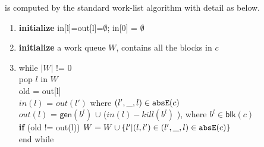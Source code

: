 \begin{enumerate}
is computed by the standard work-list algorithm with detail as below. 
\begin{enumerate}
    \item \textbf{initialize} in[l]=out[l]=$\emptyset$;
     in[0] = $\emptyset$
    \item \textbf{initialize} a work queue $W$, contains all the blocks in $c$
    \item while $|W|$ != 0 \\
          pop $l$ in $W$ \\
          old = out[l] \\
          $in(l)$ =  $out(l')$ where $(l',\_, l) \in \mathtt{abs}{\mathtt{E}}(c)$\\
          $out(l)$ = $\mathsf{gen}(b^l)$ $\cup$ ($in(l) - kill(b^l)$ ), where $b^l \in \mathsf{blk}(c)$   \\
          \textbf{if} (old != out(l)) $W = W \cup \{l'| (l,l') \in (l',\_, l) \in \mathtt{abs}{\mathtt{E}}(c)\}$ \\
          end while
\end{enumerate}
\end{enumerate}
%
